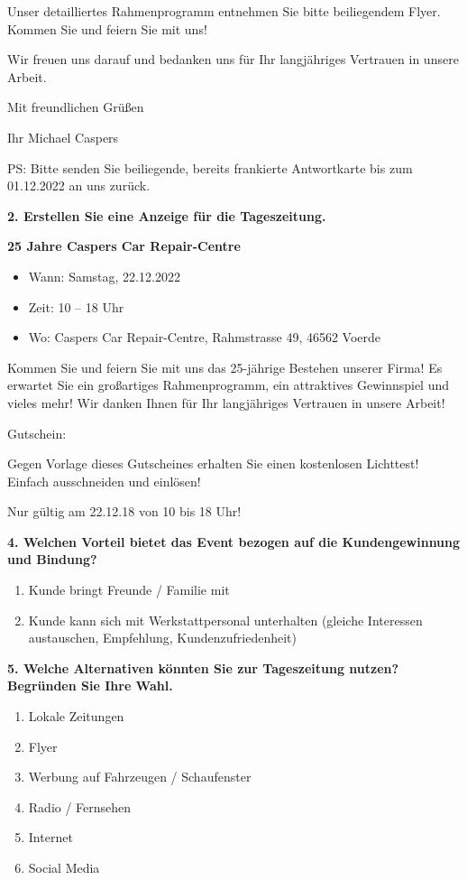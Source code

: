 Unser detailliertes Rahmenprogramm entnehmen Sie bitte beiliegendem
Flyer. Kommen Sie und feiern Sie mit uns!

Wir freuen uns darauf und bedanken uns für Ihr langjähriges Vertrauen in
unsere Arbeit.

Mit freundlichen Grüßen

Ihr Michael Caspers

PS: Bitte senden Sie beiliegende, bereits frankierte Antwortkarte bis
zum 01.12.2022 an uns zurück.

\newpage

\textbf{2. Erstellen Sie eine Anzeige für die Tageszeitung.}

\textbf{25 Jahre Caspers Car Repair-Centre}

\begin{itemize}
\item
  Wann: Samstag, 22.12.2022
\item
  Zeit: 10 -- 18 Uhr
\item
  Wo: Caspers Car Repair-Centre, Rahmstrasse 49, 46562 Voerde
\end{itemize}

Kommen Sie und feiern Sie mit uns das 25-jährige Bestehen unserer Firma!
Es erwartet Sie ein großartiges Rahmenprogramm, ein attraktives
Gewinnspiel und vieles mehr! Wir danken Ihnen für Ihr langjähriges
Vertrauen in unsere Arbeit!

Gutschein:

Gegen Vorlage dieses Gutscheines erhalten Sie einen kostenlosen
Lichttest! Einfach ausschneiden und einlösen!

Nur gültig am 22.12.18 von 10 bis 18 Uhr!

\textbf{4. Welchen Vorteil bietet das Event bezogen auf die
Kundengewinnung und Bindung?}

\begin{enumerate}
\item
  Kunde bringt Freunde / Familie mit
\item
  Kunde kann sich mit Werkstattpersonal unterhalten (gleiche Interessen
  austauschen, Empfehlung, Kundenzufriedenheit)
\end{enumerate}

\textbf{5. Welche Alternativen könnten Sie zur Tageszeitung nutzen?
Begründen Sie Ihre Wahl.}

\begin{enumerate}
\item
  Lokale Zeitungen
\item
  Flyer
\item
  Werbung auf Fahrzeugen / Schaufenster
\item
  Radio / Fernsehen
\item
  Internet
\item
  Social Media
\end{enumerate}

